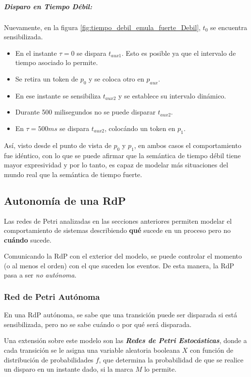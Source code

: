 \subparagraph{Disparo en Tiempo Débil:}
Nuevamente, en la figura \ref{fig:tiempo_debil_emula_fuerte_Debil}, $t_{0}$ se
encuentra sensibilizada.
\begin{itemize}
  \item En el instante $\tau = 0$ se dispara $t_{aux1}$. Esto es posible ya que
  el intervalo de tiempo asociado lo permite.
  \item Se retira un token de $p_{0}$ y se coloca otro en $p_{aux}$.
  \item En ese instante se sensibiliza $t_{aux2}$ y se establece su intervalo dinámico.
  \item Durante 500 milisegundos no se puede disparar $t_{aux2}$.
  \item En $\tau = 500ms$ se dispara $t_{aux2}$, colocándo un token en $p_{1}$.
\end{itemize}

Así, visto desde el punto de vista de $p_{0}$ y $p_{1}$, en ambos casos el
comportamiento fue idéntico, con lo que se puede afirmar que la
semántica de tiempo débil tiene mayor expresividad y por lo tanto, es capaz de
modelar más situaciones del mundo real que la semántica de tiempo fuerte.


\subsection{Autonomía de una RdP}

Las redes de Petri analizadas en las secciones anteriores permiten modelar el
comportamiento de sistemas describiendo \textbf{qué} sucede en un proceso pero
no \textbf{cuándo} sucede.

Comunicando la RdP con el exterior del modelo, se puede controlar el momento (o
al menos el orden) con el que suceden los eventos. De esta manera, la RdP pasa a
ser \textit{no autónoma}.

\subsubsection{Red de Petri Autónoma}

En una RdP autónoma, se sabe que una transición puede ser disparada si está
sensibilizada, pero no se sabe cuándo o por qué será disparada.

Una extensión sobre este modelo son las \textit{\textbf{Redes de Petri
Estocásticas}}, donde a cada transición se le asigna una variable aleatoria
booleana $X$ con función de distribución de probabilidades $f$, que determina la
probabilidad de que se realice un disparo en un instante dado, si la marca $M$ lo permite.

